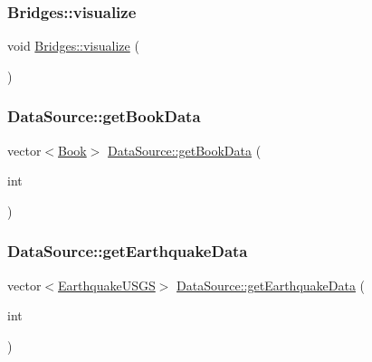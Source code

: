 \subsubsection{\texorpdfstring{Bridges\+::visualize}{Bridges::visualize}}
{\footnotesize\ttfamily void \hyperlink{namespacebridges_1_1_bridges_a2806e395134614cdd6327400b53d28ad}{Bridges\+::visualize} (\begin{DoxyParamCaption}{ }\end{DoxyParamCaption})\hspace{0.3cm}{\ttfamily [friend]}}

\hypertarget{classbridges_1_1_server_comm_a88217d2db8656b5bc4a5e32feb9fd2d8}{}\label{classbridges_1_1_server_comm_a88217d2db8656b5bc4a5e32feb9fd2d8} 
\subsubsection{\texorpdfstring{Data\+Source\+::get\+Book\+Data}{DataSource::getBookData}}
{\footnotesize\ttfamily vector$<$\hyperlink{classbridges_1_1_book}{Book}$>$ \hyperlink{namespacebridges_1_1_data_source_aa7f1de628f3ad3309dbf89bd61108990}{Data\+Source\+::get\+Book\+Data} (\begin{DoxyParamCaption}\item[{int}]{ }\end{DoxyParamCaption})\hspace{0.3cm}{\ttfamily [friend]}}

\hypertarget{classbridges_1_1_server_comm_a29b51cd765158c2022cdf624302a6f41}{}\label{classbridges_1_1_server_comm_a29b51cd765158c2022cdf624302a6f41} 
\subsubsection{\texorpdfstring{Data\+Source\+::get\+Earthquake\+Data}{DataSource::getEarthquakeData}}
{\footnotesize\ttfamily vector$<$\hyperlink{classbridges_1_1_earthquake_u_s_g_s}{Earthquake\+U\+S\+GS}$>$ \hyperlink{namespacebridges_1_1_data_source_a2af96553650d859b102f179b3db55389}{Data\+Source\+::get\+Earthquake\+Data} (\begin{DoxyParamCaption}\item[{int}]{ }\end{DoxyParamCaption})\hspace{0.3cm}{\ttfamily [friend]}}

